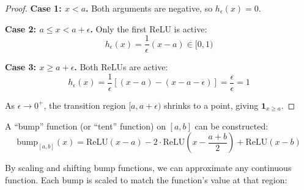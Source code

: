 \documentclass[main.tex]{subfiles}
\begin{document}
\begin{proof}
\textbf{Case 1: $x < a$.} Both arguments are negative, so $h_\epsilon(x) = 0$.

\textbf{Case 2: $a \leq x < a + \epsilon$.} Only the first ReLU is active:
$$h_\epsilon(x) = \frac{1}{\epsilon}(x - a) \in [0, 1)$$

\textbf{Case 3: $x \geq a + \epsilon$.} Both ReLUs are active:
$$h_\epsilon(x) = \frac{1}{\epsilon}[(x-a) - (x-a-\epsilon)] = \frac{\epsilon}{\epsilon} = 1$$

As $\epsilon \to 0^+$, the transition region $[a, a+\epsilon)$ shrinks to a point, giving $\mathbf{1}_{x \geq a}$.
\end{proof}

\begin{lemma}
A ``bump'' function (or ``tent'' function) on $[a, b]$ can be constructed:
$$\text{bump}_{[a,b]}(x) = \text{ReLU}(x-a) - 2\cdot\text{ReLU}\left(x - \frac{a+b}{2}\right) + \text{ReLU}(x-b)$$
\end{lemma}

\begin{center}
\end{center}

By scaling and shifting bump functions, we can approximate any continuous function. Each bump is scaled to match the function's value at that region:
\end{document}
